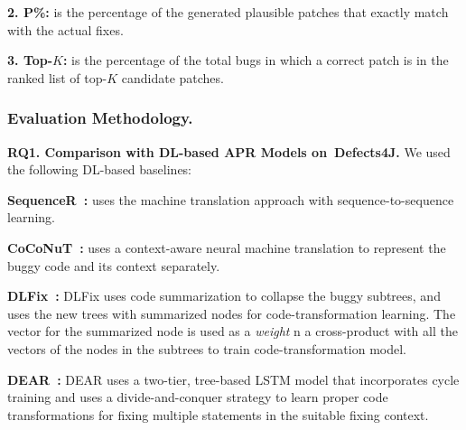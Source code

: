 {\bf 2. P\%:} is the percentage of the generated plausible patches
that exactly match with the actual fixes.

{\bf 3. Top-$K$:} is the percentage of the total bugs in which a correct
patch is in the ranked list of top-$K$ candidate patches.

\subsubsection{Evaluation Methodology.\\}

{\bf RQ1. Comparison with DL-based APR Models on~Defects4J.}  We used
the following DL-based baselines:



{\bf SequenceR~\cite{chen2018sequencer}: } uses the machine
translation approach with sequence-to-sequence learning.

{\bf CoCoNuT~\cite{lutellier2020coconut}:} uses a context-aware neural
machine translation to represent the buggy code and its
context separately.


{\bf DLFix~\cite{icse20}:}
DLFix uses code summarization to collapse the buggy subtrees, and uses the
new trees with summarized nodes for code-transformation learning.
The vector for the summarized node is used as a {\em weight}
n a cross-product with all the vectors of the nodes in the subtrees to
train code-transformation model.

{\bf DEAR~\cite{icse22}:} DEAR uses a two-tier, tree-based LSTM model
that incorporates cycle training and uses a divide-and-conquer
strategy to learn proper code transformations for fixing multiple
statements in the suitable fixing context.

